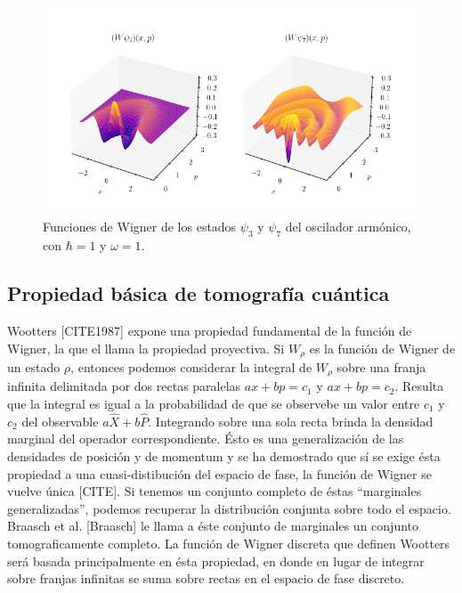 \documentclass[a4paper]{report}
\begin{document}
  \begin{figure}[ht]
    \centering
    \includegraphics[width=1\textwidth]{
      imgs/harmonic_osc_wigner.png
    }
    \caption{Funciones de Wigner de los estados $\psi_3$ y
    $\psi_7$ del oscilador armónico, con $\hbar = 1$ y
    $\omega = 1$.}
    \label{fig:harmonic_osc_wigner_3_7}
  \end{figure}

  \subsection{Propiedad básica de tomografía cuántica}

  Wootters [CITE1987] expone una propiedad fundamental de la
  función de Wigner, la que el llama la propiedad
  proyectiva. Si $W_\rho$ es la función de Wigner de un
  estado $\rho$, entonces podemos considerar la integral de
  $W_\rho$ sobre una franja infinita delimitada por dos
  rectas paralelas $ax+bp=c_1$ y $ax+bp=c_2$. Resulta que la
  integral es igual a la probabilidad de que se observebe un
  valor entre $c_1$ y $c_2$ del observable
  $a \hat X + b \hat P$.  Integrando sobre una sola recta
  brinda la densidad marginal del operador correspondiente.
  Ésto es una generalización de las  densidades de posición
  y de momentum y se ha demostrado que sí se exige ésta
  propiedad a una cuasi-distibución del espacio de fase, la
  función de Wigner se vuelve única [CITE]. Si tenemos un
  conjunto completo de éstas ``marginales generalizadas'',
  podemos recuperar la distribución conjunta sobre todo el
  espacio. Braasch et al. [Braasch] le llama a éste conjunto
  de marginales un conjunto tomograficamente completo. La
  función de Wigner discreta que definen Wootters
  será basada principalmente en ésta propiedad, en donde en
  lugar de integrar sobre franjas infinitas se suma sobre
  rectas en el espacio de fase discreto.
\end{document}
